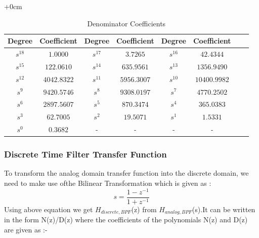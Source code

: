 \documentclass{article}
\begin{document}
\begin{table}[H]
    \centering
    \begin{adjustwidth}{+0cm}{}
        \caption{Denominator Coefficients}
        \begin{tabular}{|c|c|c|c|c|c|c|c|}
            \hline
            Degree & Coefficient & Degree & Coefficient & Degree & Coefficient\\
            \hline
            $s^{18}$ & $1.0000$ & $s^{17}$ & $3.7265$ & $s^{16}$ & $42.4344$ \\
            \hline
            $s^{15}$ & $122.0610$ & $s^{14}$ & $635.9561$ & $s^{13}$ & $1356.9490$ \\
            \hline
            $s^{12}$ & $4042.8322$ & $s^{11}$ & $5956.3007$ & $s^{10}$ & $10400.9982$ \\
            \hline
            $s^{9}$ & $9420.5746$ & $s^{8}$ & $9308.0197$ & $s^{7}$ & $4770.2502$ \\
            \hline
            $s^{6}$ & $2897.5607$ & $s^{5}$ & $870.3474$ & $s^{4}$ & $365.0383$ \\
            \hline
            $s^{3}$ & $62.7005$ & $s^{2}$ & $19.5071$ & $s^{1}$ & $1.5331$ \\
            \hline
            $s^{0}$ & $0.3682$ & - & - & - & - \\
            \hline
        \end{tabular}
    \end{adjustwidth}
\end{table}

\subsubsection{Discrete Time Filter Transfer Function}
To transform the analog domain transfer function into the discrete domain, we need to make use ofthe Bilinear Transformation which is given as :
\begin{equation*}
    s = \frac{1 - z^{-1}}{1 + z^{-1}}
\end{equation*}
Using  above  equation  we  get $H_{discrete,BPF}$(z)  from $H_{analog,BPF}$(s).It  can  be  written  in  the  form N(z)/D(z) where the coefficients of the polynomials N(z) and D(z) are given as :-
\end{document}
